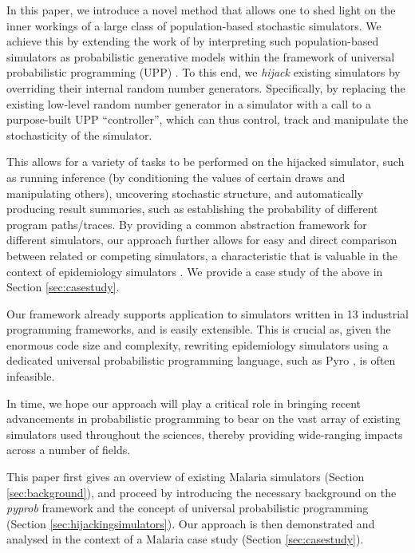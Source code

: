 \documentclass{article}
\begin{document}
In this paper, we introduce a novel method that allows one to shed light on the inner workings of a large class of population-based stochastic simulators. We achieve this by extending the work of \citep{baydin2018efficient} by interpreting such population-based simulators as probabilistic generative models within the framework of universal probabilistic programming (UPP) \cite{le-2016-inference}. To this end, we \emph{hijack} existing simulators by overriding their internal random number generators.  Specifically, by replacing the existing low-level random number generator in a simulator with a call to a purpose-built UPP ``controller'', which can thus control, track and manipulate the stochasticity of the simulator.

This allows for a variety of tasks to be performed on
the hijacked simulator, such as running inference (by conditioning
the values of certain draws and manipulating others),
uncovering stochastic structure, and automatically
producing result summaries, such as establishing the probability
of different program paths/traces.  By providing a common abstraction 
framework for different simulators, our approach further allows for
easy and direct comparison between related or competing
simulators, a characteristic that is valuable in the context of
epidemiology simulators \cite{ferris_openmalaria_2015}. We provide a case study of the above in Section \ref{sec:casestudy}.

Our framework already supports application to simulators written in 13 industrial programming frameworks, and is easily extensible. This is crucial as, given the enormous code size and complexity, rewriting epidemiology simulators using a dedicated universal probabilistic programming language, such as Pyro \cite{bingham2019pyro}, is often infeasible.

In time, we hope our approach will play a critical role in
bringing recent advancements in probabilistic programming to bear on
the vast array of existing simulators used throughout the sciences,
thereby providing wide-ranging impacts across a number of fields.

This paper first gives an overview of existing Malaria simulators (Section \ref{sec:background}), and proceed by introducing the necessary background on the \textit{pyprob} framework and the concept of universal probabilistic programming (Section \ref{sec:hijackingsimulators}). Our approach is then demonstrated and analysed in the context of a Malaria case study (Section \ref{sec:casestudy}). 
\end{document}
